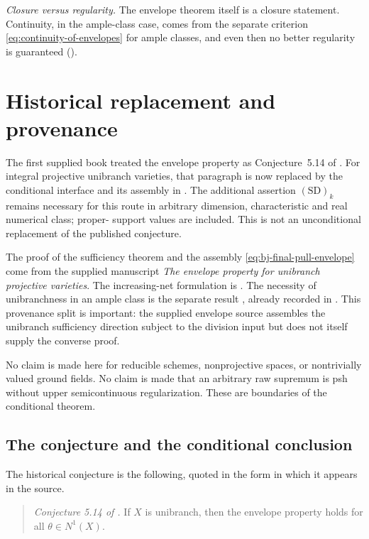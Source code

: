 \emph{Closure versus regularity.}  The envelope theorem itself is a
closure statement.  Continuity, in the ample-class case, comes
from the separate criterion \eqref{eq:continuity-of-envelopes} for ample
classes, and even then no better regularity is guaranteed
().

\section{Historical replacement and provenance}
\label{sec:ch45-historical}

The first supplied book treated the envelope property as
Conjecture~5.14 of \cite{BJ22}.
For integral projective unibranch varieties, that paragraph is now replaced
by the conditional interface  and its assembly in
.
The additional assertion $\mathrm{(SD)}_k$ remains necessary for this route
in arbitrary dimension, characteristic and real numerical class; proper-
support values are included. This is not an unconditional replacement of
the published conjecture.

The proof of the sufficiency theorem and the assembly
\eqref{eq:bj-final-pull-envelope} come from the supplied manuscript
\emph{The envelope property for unibranch projective varieties}.
The increasing-net formulation is \cite[Theorem~5.11]{BJ22}.
The necessity of unibranchness in an ample class is the separate result
\cite[Theorem~5.12]{BJ22}, already recorded in
.
This provenance split is important:
the supplied envelope source assembles the unibranch sufficiency direction
subject to the division input but
does not itself supply the converse proof.

No claim is made here for reducible schemes, nonprojective spaces, or
nontrivially valued ground fields.
No claim is made that an arbitrary raw supremum is psh without upper
semicontinuous regularization.
These are boundaries of the conditional theorem.

\subsection{The conjecture and the conditional conclusion}
\label{sec:ch45-conjecture-replaced}

The historical conjecture is the following, quoted in the form in which
it appears in the source.

\begin{quote}
\emph{Conjecture 5.14 of \cite{BJ22}.}  If $X$ is unibranch, then the
envelope property holds for all $\theta\in N^1(X)$.
\end{quote}


